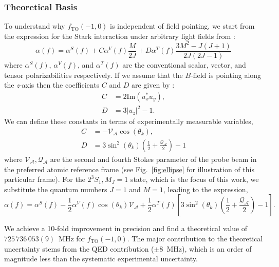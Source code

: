 \subsubsection{Theoretical Basis}
	 To understand why \(f_{\mathrm{TO}}(-1,0)\) is independent of field pointing, we start from the expression for the Stark interaction under arbitrary light fields from  \cite[Eq. 19]{LeKien13}:
	 \begin{equation}
	    \alpha(f) = \alpha^S(f) + C \alpha^V(f) \frac{M}{2J} + D \alpha^T(f) \frac{3M^2-J(J+1)}{2J(2J-1)}
	    \label{eq:polarizability_full_1}
	\end{equation}
	where \(\alpha^S(f)\), \(\alpha^V(f)\), and \(\alpha^T(f)\) are the conventional scalar, vector, and tensor polarizabilities respectively. If we assume that the \(B\)-field is pointing along the \textit{z}-axis then the coefficients \(C\) and \(D\) are given by \cite[Eq. 20]{LeKien13}:
	\begin{align}
	    C &= 2 \text{Im}(u_x^* u_y),\\
	    D &= 3|u_z|^2 -1.
	\end{align}
	We can define these constants in terms of experimentally measurable variables,
	\begin{align}
	     C &= - \mathcal{V_{A}} \cos \left( \theta_k \right), \\
	     D &= 3 \sin^2\left( \theta_k \right) \left(\frac{1}{2} +  \frac{\mathcal{Q_{A}}}{2}\right) -1 
	\end{align}
	where \(\mathcal{V_{A}},\mathcal{Q_{A}}\) are the second and fourth Stokes parameter of the probe beam in the preferred atomic reference frame (see Fig.~\ref{fig:ellipse} for illustration of this particular frame). For the $2^3S_1, M_J=1$ state, which is the focus of this work, we substitute the quantum numbers $J=1$ and $M=1$, leading to the expression,
	\begin{equation}
	    \alpha(f) = \alpha^S(f) - 
	    \frac{1}{2} \alpha^V(f)  \cos \left( \theta_k \right) \mathcal{V_{A}} + 
	    \frac{1}{2} \alpha^T(f) \left[3 \sin^2\left( \theta_k \right) \left(\frac{1}{2} +  \frac{\mathcal{Q_{A}}}{2}\right) -1 \right].
	    \label{eq:polarizability_full}
	\end{equation}


	We achieve a 10-fold improvement in precision and find a theoretical value of \(725\,736\,053(9)\)~MHz for \(f_{\mathrm{TO}}(-1,0)\). The major contribution to the theoretical uncertainty stems from the QED contribution (\(\pm 8\)~MHz), which is an order of magnitude less than the systematic experimental uncertainty.


